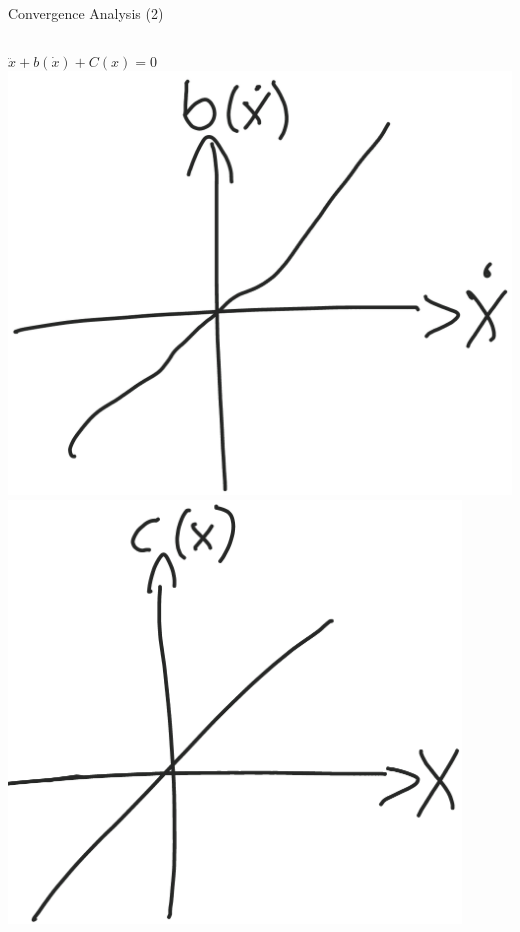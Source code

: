 \documentclass{beamer}
\begin{document}
\begin{frame}{Convergence Analysis (2)}
    \begin{columns}[T]
        $\ddot{x}+b(\dot{x})+C(x)=0$\\
        \vspace{1cm}
        \includegraphics[width=\textwidth]{fig/bx.png}   
        \vspace{1cm}
        \includegraphics[width=0.9\textwidth]{fig/cx.png}   
    \end{columns}
\end{frame}
\end{document}
